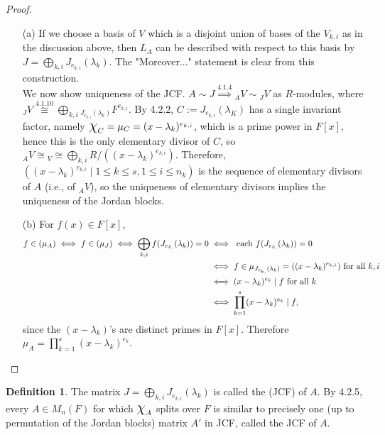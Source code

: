 \documentclass[11pt]{book}
\theoremstyle{definition}   \newtheorem{defn}[counter]{Definition} %
\newcommand{\Chi}{\mbox{\Large $\chi$}}
\newcommand{\vs}{\vspace{8pt}}   \newcommand{\hs}{\hspace{8pt}}
\numberwithin{counter}{chapter}
\begin{document}
\begin{proof}\ 
\begin{enumerate}
\item[(a)] If we choose a basis of $V$ which is a disjoint union of bases of the $V_{k,i}$ as in the discussion above, then $L_A$ can be described with respect to this basis by $J = \bigoplus_{k,i} J_{e_{k,i}}(\lambda_k)$. The "Moreover..." statement is clear from this construction. \\

We now show uniqueness of the JCF. $A \sim J \overset{4.1.4}{\implies} {_AV} \sim {_JV}$ as $R$-modules, where $_JV \overset{4.1.10}{\cong} \bigoplus_{k,i} {_{J_{e_{k,i}}(\lambda_k)} F^{e_{k,i}}}$. By 4.2.2, $C := J_{e_{k,i}}(\lambda_K)$ has a single invariant factor, namely $\Chi_C = \mu_C = (x-\lambda_k)^{e_{k,i}}$, which is a prime power in $F[x]$, hence this is the only elementary divisor of $C$, so ${_AV} \cong {_V} \cong \bigoplus_{k,i} R/((x-\lambda_k)^{e_{k,i}})$. Therefore, $((x-\lambda_k)^{e_{k,i}} \mid 1 \leq k \leq s, 1 \leq i \leq n_k)$ is the sequence of elementary divisors of $A$ (i.e., of ${_AV}$), so the uniqueness of elementary divisors implies the uniqueness of the Jordan blocks.
\item[(b)] For $f(x) \in F[x]$, 
\begin{align*}
f \in (\mu_A) \iff f \in (\mu_J) \iff \bigoplus_{k,i} f(J_{e_{k,}}(\lambda_k)) = 0 &\iff \textnormal{ each } f(J_{e_{k,}}(\lambda_k)) = 0 \\
& \iff f \in \mu_{J_{e_{k,}}(\lambda_k)} = ((x-\lambda_k)^{e_{k,i}}) \textnormal{ for all }k,i \\
&\iff (x-\lambda_k)^{e_k} \mid f \textnormal{ for all } k \\
&\iff \prod_{k=1}^s (x-\lambda_k)^{e_k} \mid f, 
\end{align*} 
since the $(x-\lambda_k)$'s are distinct primes in $F[x]$. Therefore $\mu_A = \prod_{k=1}^s (x-\lambda_k)^{e_k}$. 
\end{enumerate}
\end{proof}

\vs

\begin{defn}
The matrix $J = \bigoplus_{k,i} J_{e_{k,i}}(\lambda_k)$ is called the  (JCF) of $A$. By 4.2.5, every $A \in M_n(F)$ for which $\Chi_A$ splits over $F$ is similar to precisely one (up to permutation of the Jordan blocks) matrix $A'$ in JCF, called the JCF of $A$.
\end{defn}
\end{document}
